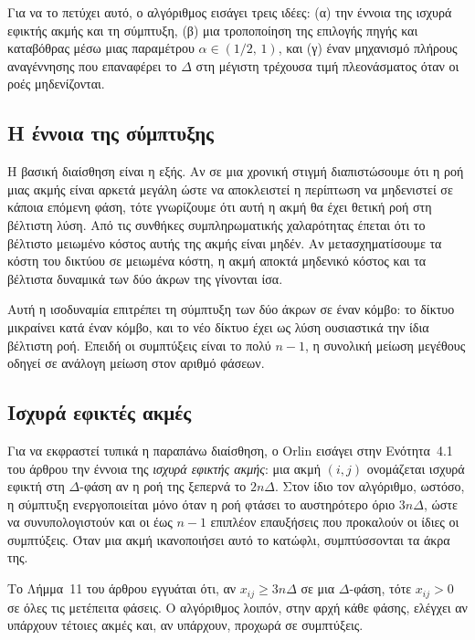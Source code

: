 \documentclass[11pt,a4paper,oneside]{report}
\let\oldsubsection\subsection
\renewcommand{\subsection}{\FloatBarrier\oldsubsection}
\begin{document}
Για να το πετύχει αυτό, ο αλγόριθμος εισάγει τρεις ιδέες: (α) την έννοια της ισχυρά εφικτής ακμής και τη σύμπτυξη, (β) μια τροποποίηση της επιλογής πηγής και καταβόθρας μέσω μιας παραμέτρου $\alpha \in (1/2,\, 1)$, και (γ) έναν μηχανισμό πλήρους αναγέννησης που επαναφέρει το $\Delta$ στη μέγιστη τρέχουσα τιμή πλεονάσματος όταν οι ροές μηδενίζονται.

\subsection{Η έννοια της σύμπτυξης}

Η βασική διαίσθηση είναι η εξής. Αν σε μια χρονική στιγμή διαπιστώσουμε ότι η ροή μιας ακμής είναι αρκετά μεγάλη ώστε να αποκλειστεί η περίπτωση να μηδενιστεί σε κάποια επόμενη φάση, τότε γνωρίζουμε ότι αυτή η ακμή θα έχει θετική ροή στη βέλτιστη λύση. Από τις συνθήκες συμπληρωματικής χαλαρότητας έπεται ότι το βέλτιστο μειωμένο κόστος αυτής της ακμής είναι μηδέν. Αν μετασχηματίσουμε τα κόστη του δικτύου σε μειωμένα κόστη, η ακμή αποκτά μηδενικό κόστος και τα βέλτιστα δυναμικά των δύο άκρων της γίνονται ίσα.

Αυτή η ισοδυναμία επιτρέπει τη σύμπτυξη των δύο άκρων σε έναν κόμβο: το δίκτυο μικραίνει κατά έναν κόμβο, και το νέο δίκτυο έχει ως λύση ουσιαστικά την ίδια βέλτιστη ροή. Επειδή οι συμπτύξεις είναι το πολύ $n-1$, η συνολική μείωση μεγέθους οδηγεί σε ανάλογη μείωση στον αριθμό φάσεων.

\subsection{Ισχυρά εφικτές ακμές}

Για να εκφραστεί τυπικά η παραπάνω διαίσθηση, ο \textenglish{Orlin} εισάγει στην Ενότητα~4.1 του άρθρου την έννοια της \emph{ισχυρά εφικτής ακμής}: μια ακμή $(i,j)$ ονομάζεται ισχυρά εφικτή στη $\Delta$-φάση αν η ροή της ξεπερνά το $2n\Delta$. Στον ίδιο τον αλγόριθμο, ωστόσο, η σύμπτυξη ενεργοποιείται μόνο όταν η ροή φτάσει το αυστηρότερο όριο $3n\Delta$, ώστε να συνυπολογιστούν και οι έως $n-1$ επιπλέον επαυξήσεις που προκαλούν οι ίδιες οι συμπτύξεις. Όταν μια ακμή ικανοποιήσει αυτό το κατώφλι, συμπτύσσονται τα άκρα της.

Το Λήμμα~11 του άρθρου εγγυάται ότι, αν $x_{ij} \geq 3n\Delta$ σε μια $\Delta$-φάση, τότε $x_{ij} > 0$ σε όλες τις μετέπειτα φάσεις. Ο αλγόριθμος λοιπόν, στην αρχή κάθε φάσης, ελέγχει αν υπάρχουν τέτοιες ακμές και, αν υπάρχουν, προχωρά σε συμπτύξεις.
\end{document}

